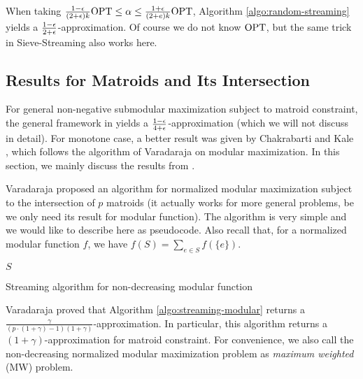 When taking $\frac{1 - \epsilon}{(2 + \epsilon)k}\text{OPT}\leq \alpha \leq \frac{1 + \epsilon}{(2 + e)k}\text{OPT}$, Algorithm \ref{algo:random-streaming} yields a $\frac{1 - \epsilon}{2 + \epsilon}$-approximation. Of course we do not know $\text{OPT}$, but the same trick in {\sc Sieve-Streaming} also works here.



\subsection{Results for Matroids and Its Intersection}
For general non-negative submodular maximization subject to matroid constraint, the general framework in \cite{CGQ15} yields a $\frac{1 - \epsilon}{4 + \epsilon}$-approximation (which we will not discuss in detail). For monotone case, a better result was given by Chakrabarti and Kale \cite{CK14}, which follows the algorithm of Varadaraja \cite{V11} on modular maximization. In this section, we mainly discuss the results from \cite{V11,CK14}.

Varadaraja \cite{V11} proposed an algorithm for normalized modular maximization subject to the intersection of $p$ matroids (it actually works for more general problems, be we only need its result for modular function). The algorithm is very simple and we would like to describe here as pseudocode. Also recall that, for a normalized modular function $f$, we have $f(S) = \sum_{e\in S}f(\{e\})$. 



\begin{algorithm}[H]
\DontPrintSemicolon %

 {
}
\Return $S$\;
\caption{Streaming algorithm for non-decreasing modular function}
\label{algo:streaming-modular}
\end{algorithm}

Varadaraja proved that Algorithm \ref{algo:streaming-modular} returns a $\frac{\gamma}{(p\cdot (1 + \gamma) - 1)(1 + \gamma)}$-approximation. In particular, this algorithm returns a $(1 + \gamma)$-approximation for matroid constraint. For convenience, we also call the non-decreasing normalized modular maximization
problem as \emph{maximum weighted} (MW) problem. 

